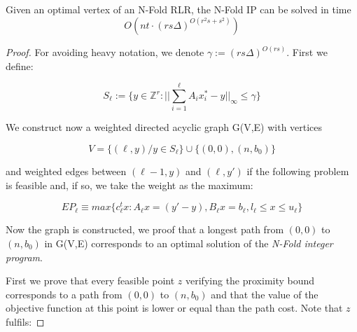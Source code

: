 \begin{proposition}
    Given an optimal vertex of an N-Fold RLR, the N-Fold IP can be solved in time
    \begin{equation*}
        O(nt \cdot (rs\Delta)^{O(r^2s+s^2)})
    \end{equation*}
\end{proposition}
\begin{proof}
For avoiding heavy notation, we denote $\gamma := (rs\Delta)^{O(rs)}$. First we define:

\vspace{-20pt}

\begin{equation*}
S_\ell := \{ y \in \mathbb{Z}^r: || \sum_{i=1}^\ell A_ix_i^* - y||_\infty \leq \gamma \}
\end{equation*}
        
\vspace{-10pt}        

We construct now a weighted directed acyclic graph G(V,E) with vertices

\vspace{-20pt}

\begin{equation*}
    V = \{(\ell,y) / y \in S_\ell\} \cup \{ (0,0), (n,b_0) \}
\end{equation*}

\vspace{-10pt}

and weighted edges between $(\ell-1,y)$ and $(\ell,y')$ if the following problem is feasible and, if so, we take the weight as the maximum:

\vspace{-20pt}

\begin{equation*}
    EP_\ell \equiv max\{c_\ell^tx: A_\ell x = (y'-y), B_\ell x = b_\ell, l_\ell \leq x \leq u_\ell \}
\end{equation*}

\vspace{-10pt}

Now the graph is constructed, we proof that a longest path from $(0,0)$ to $(n,b_0)$ in G(V,E) corresponds to an optimal solution of the \emph{N-Fold integer program}.

First we prove that every feasible point $z$ verifying the proximity bound corresponds to a path from $(0,0)$ to $(n,b_0)$ and that the value of the objective function at this point is lower or equal than the path cost. Note that $z$ fulfils:


\end{proof}
